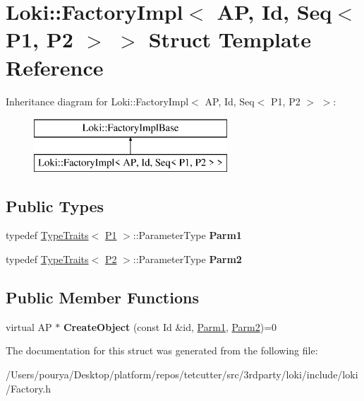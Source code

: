 \hypertarget{structLoki_1_1FactoryImpl_3_01AP_00_01Id_00_01Seq_3_01P1_00_01P2_01_4_01_4}{}\section{Loki\+:\+:Factory\+Impl$<$ A\+P, Id, Seq$<$ P1, P2 $>$ $>$ Struct Template Reference}
\label{structLoki_1_1FactoryImpl_3_01AP_00_01Id_00_01Seq_3_01P1_00_01P2_01_4_01_4}
Inheritance diagram for Loki\+:\+:Factory\+Impl$<$ A\+P, Id, Seq$<$ P1, P2 $>$ $>$\+:\begin{figure}[H]
\begin{center}
\leavevmode
\includegraphics[height=2.000000cm]{structLoki_1_1FactoryImpl_3_01AP_00_01Id_00_01Seq_3_01P1_00_01P2_01_4_01_4}
\end{center}
\end{figure}
\subsection*{Public Types}
\begin{DoxyCompactItemize}
\item 
\hypertarget{structLoki_1_1FactoryImpl_3_01AP_00_01Id_00_01Seq_3_01P1_00_01P2_01_4_01_4_a5dfa4f7fb4ee3981836805b5c1f0ef12}{}typedef \hyperlink{classLoki_1_1TypeTraits}{Type\+Traits}$<$ \hyperlink{structP1}{P1} $>$\+::Parameter\+Type {\bfseries Parm1}\label{structLoki_1_1FactoryImpl_3_01AP_00_01Id_00_01Seq_3_01P1_00_01P2_01_4_01_4_a5dfa4f7fb4ee3981836805b5c1f0ef12}

\item 
\hypertarget{structLoki_1_1FactoryImpl_3_01AP_00_01Id_00_01Seq_3_01P1_00_01P2_01_4_01_4_a13c894b657ce439896d768059d01a519}{}typedef \hyperlink{classLoki_1_1TypeTraits}{Type\+Traits}$<$ \hyperlink{structP2}{P2} $>$\+::Parameter\+Type {\bfseries Parm2}\label{structLoki_1_1FactoryImpl_3_01AP_00_01Id_00_01Seq_3_01P1_00_01P2_01_4_01_4_a13c894b657ce439896d768059d01a519}

\end{DoxyCompactItemize}
\subsection*{Public Member Functions}
\begin{DoxyCompactItemize}
\item 
\hypertarget{structLoki_1_1FactoryImpl_3_01AP_00_01Id_00_01Seq_3_01P1_00_01P2_01_4_01_4_a119c68bac879cf60c68d508e7e121a99}{}virtual A\+P $\ast$ {\bfseries Create\+Object} (const Id \&id, \hyperlink{classLoki_1_1EmptyType}{Parm1}, \hyperlink{classLoki_1_1EmptyType}{Parm2})=0\label{structLoki_1_1FactoryImpl_3_01AP_00_01Id_00_01Seq_3_01P1_00_01P2_01_4_01_4_a119c68bac879cf60c68d508e7e121a99}

\end{DoxyCompactItemize}


The documentation for this struct was generated from the following file\+:\begin{DoxyCompactItemize}
\item 
/\+Users/pourya/\+Desktop/platform/repos/tetcutter/src/3rdparty/loki/include/loki/Factory.\+h\end{DoxyCompactItemize}
